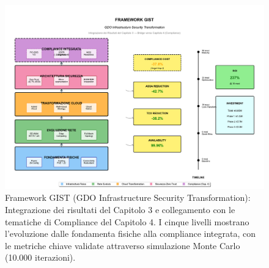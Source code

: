\begin{figure}[htbp]
\centering
\includegraphics[width=\textwidth]{thesis_figures/cap3/figura_3_6_framework_integrato.pdf}
\caption{Framework GIST (GDO Infrastructure Security Transformation): Integrazione dei risultati del Capitolo 3 e collegamento con le tematiche di Compliance del Capitolo 4. I cinque livelli mostrano l'evoluzione dalle fondamenta fisiche alla compliance integrata, con le metriche chiave validate attraverso simulazione Monte Carlo (10.000 iterazioni).}
\label{fig:framework_gist}
\end{figure}

\clearpage
\printbibliography[
    heading=subbibliography,
    title={Riferimenti Bibliografici del Capitolo 3},
]

\endrefsection

\clearpage